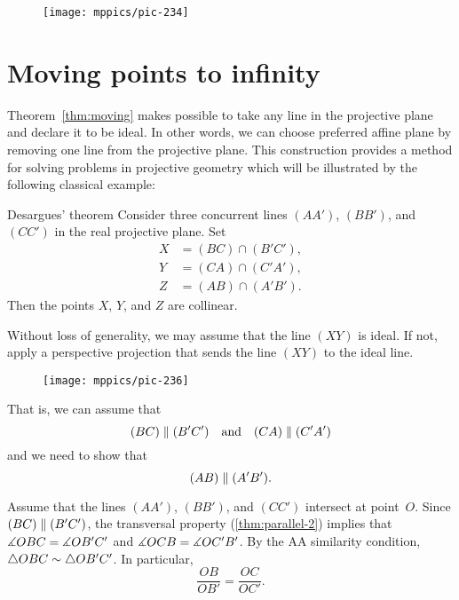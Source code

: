 {

\begin{wrapfigure}{r}{37mm}
\vskip6mm
\centering
\texttt{[image: mppics/pic-234]}
\end{wrapfigure}

\section*{Moving points to infinity}


Theorem~\ref{thm:moving} makes possible to take any line in the projective plane and declare it to be ideal.
In other words, we can choose preferred affine plane by removing one line from the projective plane.
This construction provides a method for solving problems in projective geometry 
which will be illustrated by the following classical example:


\begin{thm}{Desargues' theorem}\label{thm:desargues}
Consider three concurrent lines $(AA')$, $(BB')$, and $(CC')$ in the real projective plane.
Set
\begin{align*}
X&=(BC)\cap (B'C'),\\
Y&=(CA)\cap (C'A'),\\
Z&=(AB)\cap (A'B').
\end{align*}
Then the points $X$, $Y$, and $Z$ are collinear.
\end{thm}

}

Without loss of generality, we may assume that the line $(XY)$ is ideal.
If not, apply a perspective projection that sends the line $(XY)$ to the ideal line.

\begin{wrapfigure}{o}{40mm}
\vskip-8mm
\centering
\texttt{[image: mppics/pic-236]}
\end{wrapfigure}

That is, we can assume that 
\[(BC)\z\parallel (B'C')\quad\text{and}\quad(CA)\z\parallel (C'A')\]
and we need to show that 
\[(AB)\z\parallel(A'B').\]

Assume that the lines $(AA')$, $(BB')$, and $(CC')$ intersect at point~$O$.
Since $(BC)\z\parallel (B'C')$, 
the transversal property (\ref{thm:parallel-2}) implies that $\measuredangle OBC\z= \measuredangle OB'C'$ and $\measuredangle OCB\z= \measuredangle OC'B'$.
By the AA similarity condition, $\triangle OBC\z\sim\triangle OB'C'$.
In particular,
\[\frac{OB}{OB'}=\frac{OC}{OC'}.\]

